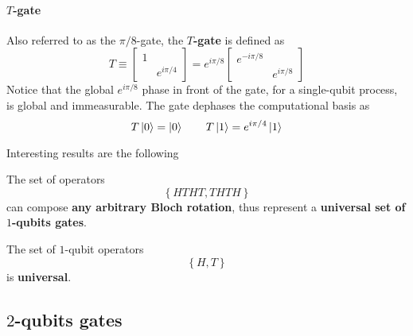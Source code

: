 \paragraph{$T$-gate} Also referred to as the $\pi/8$-gate, the \textbf{$T$-gate} is defined as
\[
    T \equiv \begin{bmatrix}
        1 & \\
          & e^{i\pi/4}
    \end{bmatrix} = e^{i\pi/8} \begin{bmatrix}
        e^{-i\pi/8} & \\
                    & e^{i\pi/8}
    \end{bmatrix}
\]
Notice that the global $e^{i\pi/8}$ phase in front of the gate, for a single-qubit process, is global and immeasurable. The gate dephases the computational basis as
\[
    T \ket{0} = \ket{0}
    \qquad
    T \ket{1} = e^{i\pi/4} \ket{1}
\]

Interesting results are the following
\begin{lemma}
    The set of operators
    \[
        \left\lbrace
            HTHT, THTH
        \right\rbrace
    \]
    can compose \textbf{any arbitrary Bloch rotation}, thus represent a \textbf{universal set of $1$-qubits gates}.
\end{lemma}
\begin{lemma}
    The set of $1$-qubit operators
    \[
        \left\lbrace 
            H, T
        \right\rbrace
    \]
    is \textbf{universal}.
\end{lemma}

\subsection{$2$-qubits gates}\label{subsec:2-qubits gates}

